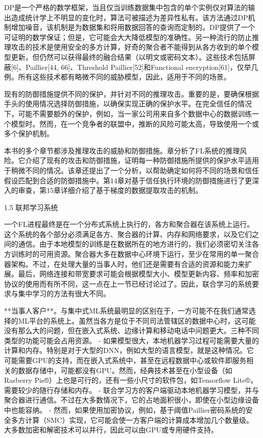 DP是一个严格的数学框架，当且仅当训练数据集中包含的单个实例仅对算法的输出造成统计学上不明显的变化时，算法可被描述为差异性私有。该方法通过DP机制增加噪音，该机制是为数据集和将用数据回答的查询而定制的。DP提供了一个可证明的数学保证；但是，它可能会大大降低模型的准确性。另一种流行的防止推理攻击的技术是使用安全的多方计算，好奇的聚合者不能得到从各方收到的单个模型更新，但仍然可以获得最终的融合结果（以明文或密码文本）。这些技术包括屏蔽[6]、Paillier[44, 66]、Threshold Paillier[52]和Functional encryption[61]，仅举几例。所有这些技术都有略微不同的威胁模型，因此，适用于不同的场景。

现有的防御措施提供不同的保护，并针对不同的推理攻击。重要的是，要确保根据手头的使用情况选择防御措施，以确保实现正确的保护水平。在完全信任的情况下，可能不需要额外的保护，例如，当一家公司用来自多个数据中心的数据训练一个模型时。然而，在一个竞争者的联盟中，推断的风险可能太高，导致使用一个或多个保护机制。

本书的多个章节都涉及推理攻击的威胁和防御措施。章分析了FL系统的推理风险。它介绍了现有的攻击和防御措施，证明每一种防御措施所提供的保护水平适用于稍微不同的情况。该章还提出了一个分析，以帮助确定如何将不同的场景和信任假设匹配到合适的防御措施中。第14章对基于信任执行环境的防御措施进行了更深入的审查，第15章详细介绍了基于梯度的数据提取攻击的机制。

1.5 联邦学习系统

一个FL进程最终是在一个分布式系统上执行的，各方和聚合器在该系统上运行。这个系统的各个部分必须满足各方、聚合器的计算、内存和网络要求，以及它们之间的通信。由于本地模型的训练是在数据所在的地方进行的，我们必须密切关注各方训练时的可用资源。聚合器大多在数据中心环境下运行，至少在常用的单一聚合器架构。不过，在处理大量的当事人时，他们还是需要有合适的资源和能力来扩展。最后，网络连接和带宽要求可能会根据模型大小、模型更新内容、频率和加密协议的使用而有所不同，这一点在上一节已经讨论过了。因此，联合学习的系统要求与集中学习的方法有很大不同。

**当事人客户**。与集中式ML系统最明显的区别在于，一方可能不在我们通常选择的ML平台的系统上。虽然当各方是位于不同司法管辖区的数据中心时，这可能没有那么大的问题，但在嵌入式系统、边缘计算和移动电话中问题更大。三种不同类型的功能可能会占用资源。
- 如果模型很大，本地机器学习过程可能需要大量的计算和内存。特别是对于大型的DNN，例如大型的语言模型，就是这种情况。它可能需要GPU的支持，而在嵌入式系统中，甚至在远程数据中心或软件即服务相关的数据存储中，可能都没有GPU。然而，经典技术甚至在小型设备（如Rasberry Pis®）上也是可行的，还有一些小尺寸的软件包，如Tensorflow Lite®，需要较少的随行存储和内存。
- 联合学习方的客户端驱动本地机器学习模型，并与聚合器进行通信。不过在大多数情况下，它的占地面积很小，即使在小型边缘设备中也能容纳。
- 然而，如果使用加密协议，例如，基于阈值Paillier密码系统的安全多方计算（SMC）实现，它可能会使一方客户端的计算成本增加几个数量级。大多数加密和解密技术可以并行，因此可以由GPU或专用硬件支持。


